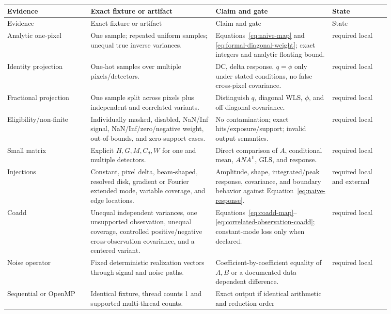 \documentclass[11pt]{article}
\newcommand{\trans}{\mathsf{T}}
\begin{document}
\begin{longtable}{L{0.20\linewidth}L{0.30\linewidth}L{0.28\linewidth}L{0.14\linewidth}}
\toprule
Evidence & Exact fixture or artifact & Claim and gate & State\\
\midrule
\endfirsthead
\toprule
Evidence & Exact fixture or artifact & Claim and gate & State\\
\midrule
\endhead
Analytic one-pixel & One sample; repeated uniform samples; unequal true
inverse variances. & Equations~\eqref{eq:naive-map} and
\eqref{eq:formal-diagonal-weight}; exact integers and analytic floating bound.
& required local\\
Identity projection & One-hot samples over multiple pixels/detectors. & DC,
delta response, \(q=\phi\) only under stated conditions, no false cross-pixel
covariance. & required local\\
Fractional projection & One sample split across pixels plus independent and
correlated variants. & Distinguish \(q\), diagonal WLS, \(\phi\), and
off-diagonal covariance. & required local\\
Eligibility/non-finite & Individually masked, disabled, NaN/Inf signal,
NaN/Inf/zero/negative weight, out-of-bounds, and zero-support cases. & No
contamination; exact hits/exposure/support; invalid output semantics. &
required local\\
Small matrix & Explicit \(H,G,M,C_d,W\) for one and multiple detectors. &
Direct comparison of \(A\), conditional mean, \(A N A^\trans\), GLS, and
response. & required local\\
Injections & Constant, pixel delta, beam-shaped, resolved disk, gradient or
Fourier extended mode, variable coverage, and edge locations. & Amplitude,
shape, integrated/peak response, covariance, and boundary behavior against
Equation~\eqref{eq:naive-response}. & required local and external\\
Coadd & Unequal independent variances, one unsupported observation, unequal
coverage, controlled positive/negative cross-observation covariance, and a
centered variant. & Equations~\eqref{eq:coadd-map}--
\eqref{eq:correlated-observation-coadd}; constant-mode loss only when declared.
& required local\\
Noise operator & Fixed deterministic realization vectors through signal and
noise paths. & Coefficient-by-coefficient equality of \(A,B\) or a documented
data-dependent difference. & required local\\
Sequential or OpenMP & Identical fixture, thread counts 1 and supported
multi-thread counts. & Exact output if identical arithmetic and reduction order

\end{longtable}
\end{document}

